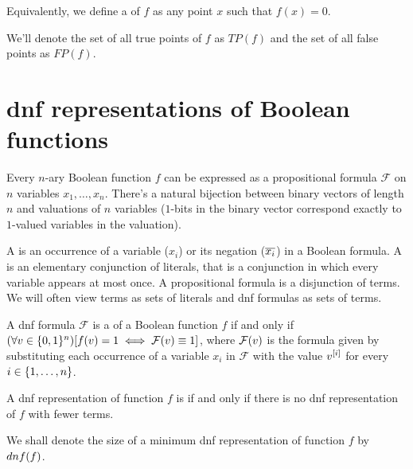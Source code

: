 Equivalently,
we define a  of $f$
as any point $x$
such that $f(x) = 0$.

We'll denote the set of all true points of $f$ as $TP(f)$
and the set of all false points as $FP(f)$.

\section{\texorpdfstring{\acrshort{dnf}}{DNF}
representations of Boolean functions}

Every $n$-ary Boolean function $f$ can be expressed
as a propositional formula $\mathcal{F}$ on $n$ variables
$x_1, \ldots, x_n$.
There's a natural bijection
between binary vectors of length $n$
and valuations of $n$ variables
($1$-bits in the binary vector
correspond exactly to $1$-valued variables
in the valuation).


\begin{definition}
A  is an occurrence
of a variable ($x_i$) or its negation ($\overline{x_i}$)
in a Boolean formula.
A  is
an elementary conjunction of literals,
that is a conjunction in which every variable appears
at most once.
A  propositional formula
is a disjunction of terms.
We will often view terms as sets of literals
and \acrshort{dnf} formulas as sets of terms.
\end{definition}

A \acrshort{dnf} formula $\mathcal{F}$ is
a 
of a Boolean function $f$
if and only if
$(\forall v \in \{0, 1\}^n) [f(v) = 1 \iff
\mathcal{F} (v) \equiv 1]$,
where $\mathcal{F} (v)$ is the formula
given by substituting
each occurrence of a variable $x_i$ in $\mathcal{F}$
with the value $v^{[i]}$
for every $i \in \{1, \ldots, n\}$.

\begin{definition}
A \acrshort{dnf} representation of function $f$ is
if and only if
there is no \acrshort{dnf} representation of $f$
with fewer terms.

We shall denote the size of
a minimum \acrshort{dnf} representation
of function $f$
by $dnf (f)$.
\end{definition}

